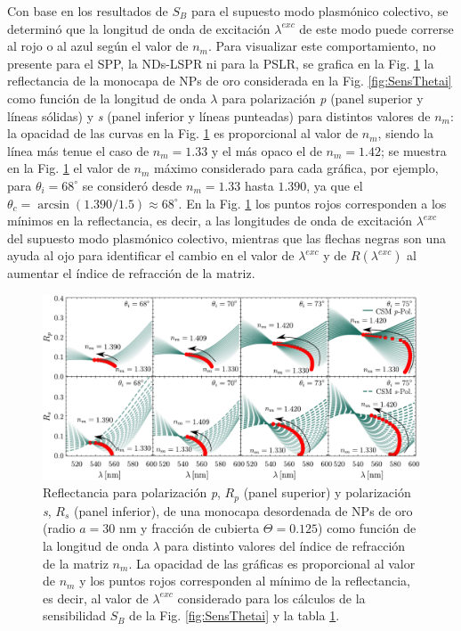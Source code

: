 Con base en los resultados de $S_B$ para el supuesto modo  plasmónico colectivo, se determinó que la longitud de onda de excitación $\lambda^{exc}$ de este modo puede correrse al rojo o al azul según el valor de $n_m$. Para visualizar este comportamiento, no presente para el SPP, la NDs-LSPR ni para la PSLR, se grafica en la Fig. \ref{fig:SensRpRs} la reflectancia de la monocapa de NPs de oro considerada en la Fig. \ref{fig:SensThetai} como función de la longitud de onda $\lambda$ para polarización \emph{p} (panel superior y líneas sólidas) y \emph{s} (panel inferior y líneas punteadas) para distintos valores de $n_m$: la opacidad de las curvas en la Fig. \ref{fig:SensRpRs} es proporcional al valor de $n_m$, siendo la línea más tenue el caso de $n_m=1.33$ y el más opaco el de $n_m=1.42$; se muestra en la Fig. \ref{fig:SensRpRs} el valor de $n_m$ máximo considerado para cada gráfica, por ejemplo, para $\theta_i=68^\circ$ se consideró desde $n_m=1.33$ hasta $1.390$, ya que el $\theta_c=\arcsin(1.390/1.5)\approx 68^\circ$. En la Fig. \ref{fig:SensRpRs} los puntos rojos corresponden a los mínimos en la reflectancia, es decir, a las longitudes de onda de excitación $\lambda^{exc}$ del supuesto modo plasmónico colectivo, mientras que las flechas negras son una ayuda al ojo para identificar el cambio en el valor de $\lambda^{exc}$ y de $R(\lambda^{exc})$ al aumentar el índice de refracción de la matriz.

\begin{figure}[h!]\centering
	\includegraphics[width=1\linewidth]{2-Resultados/figs/11-SPPCSM/2-RpRs}\vspace*{-.7em}%
\caption{Reflectancia para polarización \emph{p}, $R_p$ (panel superior) y polarización \emph{s}, $R_s$ (panel inferior), de una monocapa desordenada de NPs de oro (radio $a=30$ nm y fracción de cubierta $\Theta=0.125$)  como función de la longitud de onda $\lambda$ para distinto valores del  índice de refracción de la matriz $n_m$. La opacidad de las gráficas es proporcional al valor de $n_m$  y los puntos rojos corresponden al mínimo de la reflectancia, es decir, al valor de $\lambda^{exc}$ considerado para los cálculos de la sensibilidad $S_B$ de la Fig. \ref{fig:SensThetai} y la tabla \ref{fig:SensRpRs}.	
	}\label{fig:SensRpRs}
	\end{figure}	

